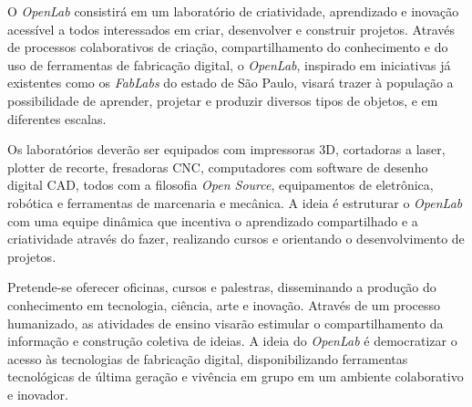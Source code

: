 O \textit{OpenLab} consistirá em um laboratório de criatividade, aprendizado e inovação acessível a todos interessados em criar, desenvolver e construir projetos. Através de processos colaborativos de criação, compartilhamento do conhecimento e do uso de ferramentas de fabricação digital, o \textit{OpenLab}, inspirado em iniciativas já existentes como os \textit{FabLabs} do estado de São Paulo, visará trazer à população a possibilidade de aprender, projetar e  produzir diversos tipos de objetos, e em diferentes escalas.

Os laboratórios deverão ser equipados com impressoras 3D, cortadoras a laser, plotter de recorte, fresadoras CNC, computadores com software de desenho digital CAD, todos com a filosofia \textit{Open Source}, equipamentos de eletrônica, robótica e ferramentas de marcenaria e mecânica. A ideia é estruturar o \textit{OpenLab} com uma equipe dinâmica que incentiva o aprendizado compartilhado e a criatividade através do fazer, realizando cursos e orientando o desenvolvimento de projetos.

Pretende-se oferecer oficinas, cursos e palestras, disseminando a produção do conhecimento em tecnologia, ciência, arte e inovação. Através de um processo humanizado, as atividades de ensino visarão estimular o compartilhamento da informação e construção coletiva de ideias. A ideia do \textit{OpenLab} é democratizar o acesso às tecnologias de fabricação digital, disponibilizando ferramentas tecnológicas de última geração e vivência em grupo em um ambiente colaborativo e inovador.
